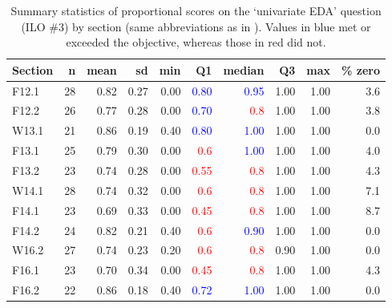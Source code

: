 \documentclass{article}\usepackage[]{graphicx}\usepackage[]{color}
\begin{document}
\begin{table}[h]
\centering
\caption{Summary statistics of proportional scores on the `univariate EDA' question (ILO \#3) by section (same abbreviations as in ). Values in blue met or exceeded the objective, whereas those in red did not.} 
\label{tab:sumUEDAQ}
\begin{tabular}{lrrrrrrrrr}
  \hline
Section & n & mean & sd & min & \textbf{Q1} & \textbf{median} & Q3 & max & \% zero \\ 
  \hline
F12.1 & 28 & 0.82 & 0.27 & 0.00 & \textcolor{red}{\textcolor{blue}{0.80}} & \textcolor{red}{\textcolor{blue}{0.95}} & 1.00 & 1.00 & 3.6 \\ 
  F12.2 & 26 & 0.77 & 0.28 & 0.00 & \textcolor{red}{\textcolor{blue}{0.70}} & \textcolor{red}{                    0.8} & 1.00 & 1.00 & 3.8 \\ 
  W13.1 & 21 & 0.86 & 0.19 & 0.40 & \textcolor{red}{\textcolor{blue}{0.80}} & \textcolor{red}{\textcolor{blue}{1.00}} & 1.00 & 1.00 & 0.0 \\ 
  F13.1 & 25 & 0.79 & 0.30 & 0.00 & \textcolor{red}{                    0.6} & \textcolor{red}{\textcolor{blue}{1.00}} & 1.00 & 1.00 & 4.0 \\ 
  F13.2 & 23 & 0.74 & 0.28 & 0.00 & \textcolor{red}{                   0.55} & \textcolor{red}{                    0.8} & 1.00 & 1.00 & 4.3 \\ 
  W14.1 & 28 & 0.74 & 0.32 & 0.00 & \textcolor{red}{                    0.6} & \textcolor{red}{                    0.8} & 1.00 & 1.00 & 7.1 \\ 
  F14.1 & 23 & 0.69 & 0.33 & 0.00 & \textcolor{red}{                   0.45} & \textcolor{red}{                    0.8} & 1.00 & 1.00 & 8.7 \\ 
  F14.2 & 24 & 0.82 & 0.21 & 0.40 & \textcolor{red}{                    0.6} & \textcolor{red}{\textcolor{blue}{0.90}} & 1.00 & 1.00 & 0.0 \\ 
  W16.2 & 27 & 0.74 & 0.23 & 0.20 & \textcolor{red}{                    0.6} & \textcolor{red}{                    0.8} & 0.90 & 1.00 & 0.0 \\ 
  F16.1 & 23 & 0.70 & 0.34 & 0.00 & \textcolor{red}{                   0.45} & \textcolor{red}{                    0.8} & 1.00 & 1.00 & 4.3 \\ 
  F16.2 & 22 & 0.86 & 0.18 & 0.40 & \textcolor{red}{\textcolor{blue}{0.72}} & \textcolor{red}{\textcolor{blue}{1.00}} & 1.00 & 1.00 & 0.0 \\ 

\end{tabular}
\end{table}
\end{document}
